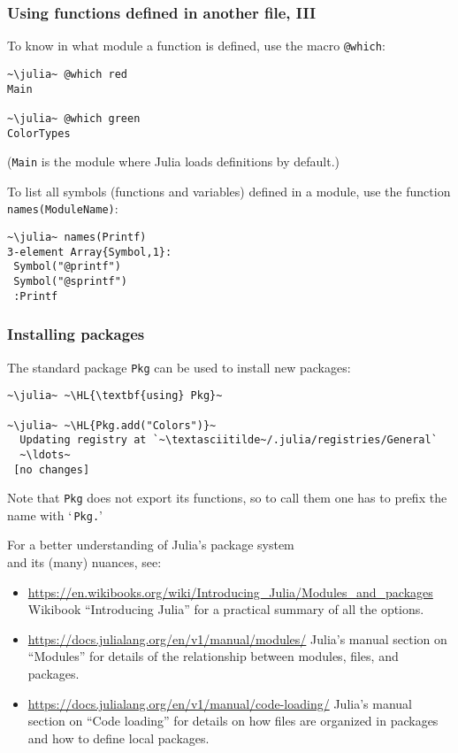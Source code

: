 \documentclass[english,serif,mathserif,xcolor=pdftex,dvipsnames,table]{beamer}
\begin{document}
\begin{frame}
  \frametitle{Using functions defined in another file, III}
  \small
  To know in what module a function is defined, use the macro \texttt{@which}:
\begin{lstlisting}
~\julia~ @which red
Main

~\julia~ @which green
ColorTypes
\end{lstlisting}
  (\texttt{Main} is the module where Julia loads definitions by default.)

  \+
  To list all symbols (functions and variables) defined in a
  module, use the function \texttt{names(ModuleName)}:
\begin{lstlisting}
~\julia~ names(Printf)
3-element Array{Symbol,1}:
 Symbol("@printf")
 Symbol("@sprintf")
 :Printf
\end{lstlisting}
\end{frame}


\begin{frame}[fragile]
  \frametitle{Installing packages}
  The standard package \texttt{Pkg} can be used to install new packages:
\begin{lstlisting}
~\julia~ ~\HL{\textbf{using} Pkg}~

~\julia~ ~\HL{Pkg.add("Colors")}~
  Updating registry at `~\textasciitilde~/.julia/registries/General`
  ~\ldots~
 [no changes]
\end{lstlisting}

  Note that \texttt{\texttt{Pkg}} does not export its functions, so to
  call them one has to prefix the name with `\,\texttt{Pkg.}'
\end{frame}


\begin{frame}[fragile]
  \small

  For a better understanding of Julia's package system \\ and its (many) nuances, see:
  \begin{itemize}
  \+\item \url{https://en.wikibooks.org/wiki/Introducing_Julia/Modules_and_packages}
    Wikibook ``Introducing Julia'' for a practical summary of all the options.
  \+\item \url{https://docs.julialang.org/en/v1/manual/modules/} Julia's manual section on ``Modules'' for details of the relationship between modules, files, and packages.
  \+\item \url{https://docs.julialang.org/en/v1/manual/code-loading/}
    Julia's manual section on ``Code loading'' for details on how
    files are organized in packages and how to define local packages.
  \end{itemize}
\end{frame}
\end{document}
